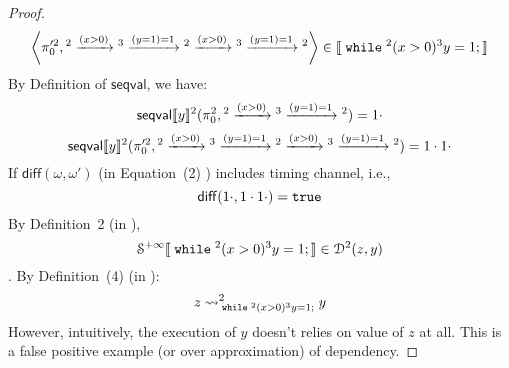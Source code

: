 \begin{example}
\begin{proof}
\[ \]
 \[
 	\left< \pi_0'^2, {}^2 \xrightarrow{(x > 0)} {}^3 \xrightarrow{(y = 1) = 1} {}^2 \xrightarrow{(x > 0)} {}^3 \xrightarrow{(y = 1) = 1}{}^2\right> \in \sem{\ewhile {}^2 (x > 0) {}^3 y = 1; }
 \]
 By Definition of $\mathsf{seqval}$, we have:
 \[
 	\mathsf{seqval}\llbracket y \rrbracket{}^2(\pi_0^2, {}^2 \xrightarrow{(x > 0)} {}^3 \xrightarrow{(y = 1) = 1} {}^2 ) = 1 \cdot
 \]
 \[
 	\mathsf{seqval}\llbracket y \rrbracket{}^2(\pi_0'^2, {}^2 \xrightarrow{(x > 0)} {}^3 \xrightarrow{(y = 1) = 1} {}^2 \xrightarrow{(x > 0)} {}^3 \xrightarrow{(y = 1) = 1}{}^2 ) = 1 \cdot 1 \cdot
 \]
 If $\mathsf{diff}(\omega, \omega')$ (in \cite{cousot2019abstract} Equation~(2) ) includes timing channel, i.e., 
 \[
 	\mathsf{diff}(1 \cdot, 1 \cdot 1 \cdot) = \mathtt{true}
 \]
 By Definition~2 (in \cite{cousot2019abstract}), 
 \[
 	\mathcal{S}^{+\infty}\llbracket \;\mathtt{while}\; {}^2 (x > 0) {}^3 y = 1; \rrbracket 
 \in \mathcal{D}^2(z, y)
 \].
 By Definition~(4) (in \cite{cousot2019abstract}):
 \[
 	z \rightsquigarrow^{2}_{\;\mathtt{while}\; {}^2 (x > 0) {}^3 y = 1;} y
 \]
 However, intuitively, the execution of $y$ doesn't relies on value of $z$ at all. This is a false positive example (or over approximation) of dependency.
 \end{proof}
 \end{example}
 \clearpage
 \clearpage
